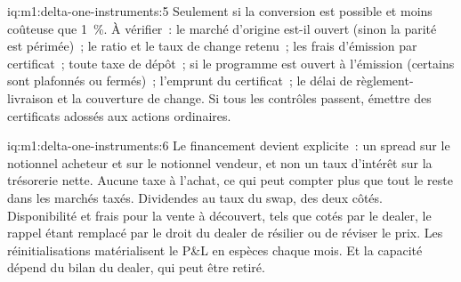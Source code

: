 \begin{solution}{iq:m1:delta-one-instruments:5}
Seulement si la conversion est possible et moins coûteuse que 1~\%. À vérifier~: le marché d'origine
est-il ouvert (sinon la parité est périmée)~; le ratio et le taux de change retenu~;
les frais d'émission par certificat~; toute taxe de dépôt~; si le programme est ouvert
à l'émission (certains sont plafonnés ou fermés)~; l'emprunt du certificat~; le délai de
règlement-livraison et la couverture de change. Si tous les contrôles passent, émettre des certificats
adossés aux actions ordinaires.
\end{solution}

\begin{solution}{iq:m1:delta-one-instruments:6}
Le financement devient explicite~: un spread sur le notionnel acheteur et sur le
notionnel vendeur, et non un taux d'intérêt sur la trésorerie nette. Aucune taxe à l'achat, ce qui peut
compter plus que tout le reste dans les marchés taxés. Dividendes au taux du
swap, des deux côtés. Disponibilité et frais pour la vente à découvert, tels que cotés par le
dealer, le rappel étant remplacé par le droit du dealer de résilier ou de réviser le prix.
Les réinitialisations matérialisent le P\&L en espèces chaque mois. Et la capacité dépend du bilan
du dealer, qui peut être retiré.
\end{solution}
